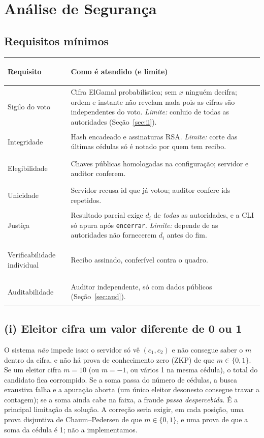 \documentclass[11pt,a4paper]{article}
\begin{document}
\section{Análise de Segurança}
\subsection{Requisitos mínimos}
\begin{tabularx}{\textwidth}{@{}>{\bfseries\raggedright\arraybackslash}p{3.1cm}Y@{}}
\toprule
Requisito & Como é atendido (e limite)\\
\midrule
Sigilo do voto & Cifra ElGamal probabilística; sem $x$ ninguém decifra; ordem e instante não revelam nada pois as cifras são independentes do voto. \emph{Limite:} conluio de todas as autoridades (Seção~\ref{sec:ii}).\\
Integridade & Hash encadeado e assinaturas RSA. \emph{Limite:} corte das últimas cédulas só é notado por quem tem recibo.\\
Elegibilidade & Chaves públicas homologadas na configuração; servidor e auditor conferem.\\
Unicidade & Servidor recusa id que já votou; auditor confere ids repetidos.\\
Justiça & Resultado parcial exige $d_i$ de \emph{todas} as autoridades, e a CLI só apura após \texttt{encerrar}. \emph{Limite:} depende de as autoridades não fornecerem $d_i$ antes do fim.\\
Verificabilidade individual & Recibo assinado, conferível contra o quadro.\\
Auditabilidade & Auditor independente, só com dados públicos (Seção~\ref{sec:aud}).\\
\bottomrule
\end{tabularx}

\subsection{(i) Eleitor cifra um valor diferente de 0 ou 1}\label{sec:i}
O sistema \emph{não} impede isso: o servidor só vê $(c_1,c_2)$ e não consegue saber o $m$ dentro da cifra, e não há prova de conhecimento zero (ZKP) de que $m\in\{0,1\}$. Se um eleitor cifra $m=10$ (ou $m=-1$, ou vários 1 na mesma cédula), o total do candidato fica corrompido. Se a soma passa do número de cédulas, a busca exaustiva falha e a apuração aborta (um único eleitor desonesto consegue travar a contagem); se a soma ainda cabe na faixa, a fraude \emph{passa despercebida}. É a principal limitação da solução. A correção seria exigir, em cada posição, uma prova disjuntiva de Chaum--Pedersen de que $m\in\{0,1\}$, e uma prova de que a soma da cédula é 1; não a implementamos.
\end{document}
